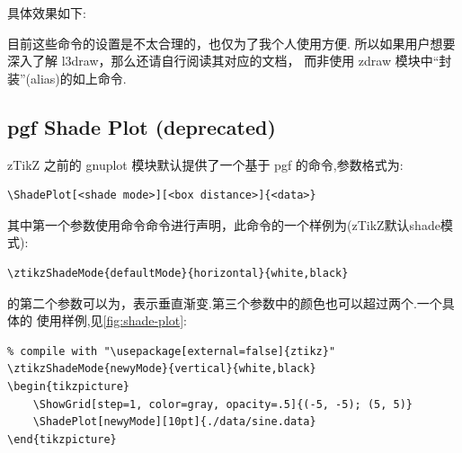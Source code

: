 具体效果如下:
\begin{center}
  \begin{zdraw}
    \newtext \texta
    \setvtext {}
    \scaletext {}
    \puttext {}
    \usepath[draw]
  \end{zdraw}
\end{center}

\begin{remark}
目前这些命令的设置是不太合理的，也仅为了我个人使用方便. 所以如果用户想要深入了解 l3draw，那么还请自行阅读其对应的文档，
而非使用 zdraw 模块中``封装''(alias)的如上命令.
\end{remark}

\subsection{pgf Shade Plot (deprecated)}
zTikZ 之前的 gnuplot 模块默认提供了一个基于 pgf 的\cmd{\ShadePlot}命令,参数格式为:
\begin{verbatim}
\ShadePlot[<shade mode>][<box distance>]{<data>}
\end{verbatim}

其中第一个参数使用命令\cmd{\ztikzShadeMode}命令进行声明，此命令的一个样例为(zTikZ默认shade模式):
\begin{verbatim}
\ztikzShadeMode{defaultMode}{horizontal}{white,black}
\end{verbatim}

\cmd{\ztikzShadeMode}的第二个参数可以为，表示垂直渐变.第三个参数中的颜色也可以超过两个.一个具体的
使用样例,见\cref{fig:shade-plot}:

\begin{verbatim}
% compile with "\usepackage[external=false]{ztikz}"
\ztikzShadeMode{newyMode}{vertical}{white,black}
\begin{tikzpicture}
    \ShowGrid[step=1, color=gray, opacity=.5]{(-5, -5); (5, 5)}
    \ShadePlot[newyMode][10pt]{./data/sine.data}
\end{tikzpicture} 
\end{verbatim}

